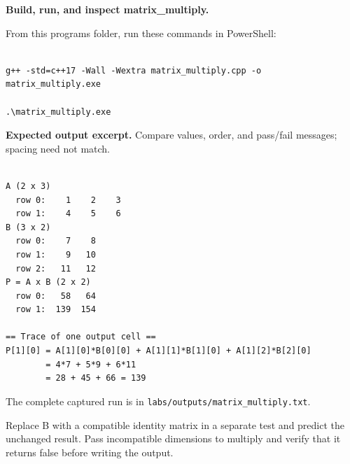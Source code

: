 \tcbbreak

\textbf{Build, run, and inspect matrix\_multiply.}

From this program\textquotesingle s folder, run these commands in PowerShell:

\begin{lstlisting}[style=utpterminal,language={}]

g++ -std=c++17 -Wall -Wextra matrix_multiply.cpp -o matrix_multiply.exe

.\matrix_multiply.exe

\end{lstlisting}

\textbf{Expected output excerpt.} Compare values, order, and pass/fail messages; spacing need not match.

\begin{lstlisting}[style=utpterminal,language={}]

A (2 x 3)
  row 0:    1    2    3
  row 1:    4    5    6
B (3 x 2)
  row 0:    7    8
  row 1:    9   10
  row 2:   11   12
P = A x B (2 x 2)
  row 0:   58   64
  row 1:  139  154

== Trace of one output cell ==
P[1][0] = A[1][0]*B[0][0] + A[1][1]*B[1][0] + A[1][2]*B[2][0]
        = 4*7 + 5*9 + 6*11
        = 28 + 45 + 66 = 139

\end{lstlisting}

The complete captured run is in \texttt{labs/outputs/matrix\_multiply.txt}.

\begin{tryit}

Replace B with a compatible identity matrix in a separate test and predict the unchanged result. Pass incompatible dimensions to multiply and verify that it returns false before writing the output.

\end{tryit}
